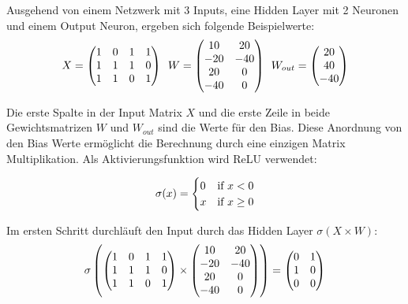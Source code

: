 Ausgehend von einem Netzwerk mit 3 Inputs, eine Hidden Layer mit 2 Neuronen und einem Output Neuron, ergeben sich folgende Beispielwerte:
\begin{equation} 
  \vspace{5pt}
  X = \begin{pmatrix}
    1 &0 &1 &1 \\
    1 &1 &1 &0 \\
    1 &1 &0 &1
  \end{pmatrix} 
  \hspace{5pt}
  W = \begin{pmatrix}
    10 &20 \\
    -20 &-40 \\
    20 &0 \\
    -40 &0
  \end{pmatrix}
  \hspace{5pt}
  W_{out} = \begin{pmatrix}
    20 \\
    40 \\
    -40
  \end{pmatrix}
\end{equation}

Die erste Spalte in der Input Matrix $ X $ und die erste Zeile in beide Gewichtsmatrizen $ W $ und $ W_{out} $ sind die Werte für den Bias.
Diese Anordnung von den Bias Werte ermöglicht die Berechnung durch eine einzigen Matrix Multiplikation. Als Aktivierungsfunktion wird ReLU 
\cite{10.5555/3104322.3104425} verwendet:

\begin{equation}
  \vspace{5pt}
  \sigma(x) = 
  \begin{cases}
    0 &\text{if \(x < 0\)}  \\
    x &\text{if \(x \geq 0\)} 
  \end{cases}
\end{equation}

Im ersten Schritt durchläuft den Input durch das Hidden Layer $ \sigma(X \times W) $:
\begin{equation}
  \vspace{5pt}
  \sigma \left(
  \begin{pmatrix}
    1 &0 &1 &1 \\
    1 &1 &1 &0 \\
    1 &1 &0 &1
  \end{pmatrix}
  \times
  \begin{pmatrix}
    10 &20 \\
    -20 &-40 \\
    20 &0 \\
    -40 &0
  \end{pmatrix}
  \right)
  =
  \begin{pmatrix}
    0 &1 \\
    1 &0 \\
    0 &0
  \end{pmatrix}
\end{equation}

